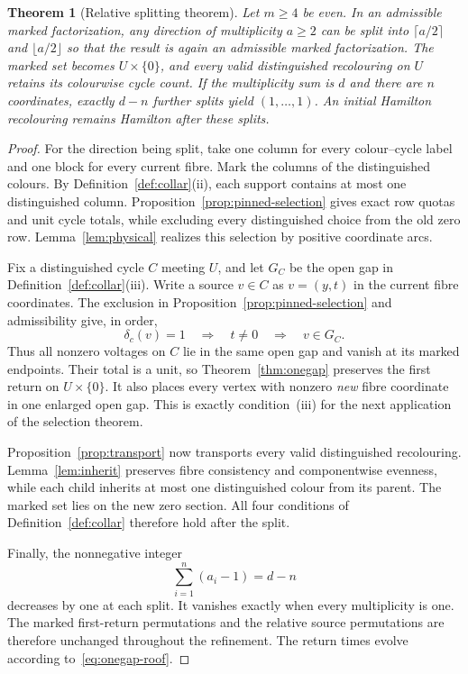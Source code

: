 \documentclass[11pt,reqno]{amsart}
\numberwithin{equation}{section}
\newtheorem{theorem}{Theorem}[section]
\theoremstyle{definition}
\theoremstyle{remark}
\begin{document}
\begin{theorem}[Relative splitting theorem]\label{thm:closure}
Let $m\ge4$ be even. In an admissible marked factorization, any direction of multiplicity
$a\ge2$ can be split into $\lceil a/2\rceil$ and $\lfloor a/2\rfloor$ so that the
result is again an admissible marked factorization. The marked set becomes $U\times\{0\}$,
and every valid distinguished recolouring on $U$ retains its colourwise cycle count.
If the multiplicity sum is $d$ and there are $n$ coordinates, exactly
$d-n$ further splits yield $(1,\ldots,1)$. An initial Hamilton recolouring
remains Hamilton after these splits.
\end{theorem}
\begin{proof}
For the direction being split, take one column for every colour--cycle label
and one block for every current fibre. Mark the columns of the distinguished colours.
By Definition~\ref{def:collar}(ii), each support contains at most one distinguished
column. Proposition~\ref{prop:pinned-selection} gives exact row quotas and unit cycle
totals, while excluding every distinguished choice from the old zero row. Lemma~\ref{lem:physical}
realizes this selection by positive coordinate arcs.

Fix a distinguished cycle $C$ meeting $U$, and let $G_C$ be the open gap
in Definition~\ref{def:collar}(iii). Write a source $v\in C$ as $v=(y,t)$ in
the current fibre coordinates. The exclusion in
Proposition~\ref{prop:pinned-selection} and admissibility give, in order,
\[
 \delta_c(v)=1\quad\Longrightarrow\quad t\ne0
             \quad\Longrightarrow\quad v\in G_C.
\]
Thus all nonzero voltages on $C$ lie in the same open gap and vanish at its
marked endpoints. Their total is a unit, so Theorem~\ref{thm:onegap}
preserves the first return on $U\times\{0\}$. It also places every vertex
with nonzero \emph{new} fibre coordinate in one enlarged open gap. This is
exactly condition~(iii) for the next application of the selection theorem.

Proposition~\ref{prop:transport} now transports every valid distinguished
recolouring. Lemma~\ref{lem:inherit} preserves fibre consistency and
componentwise evenness, while each child inherits at most one distinguished
colour from its parent. The marked set lies on the new zero section.
All four conditions of Definition~\ref{def:collar} therefore hold after the split.

Finally, the nonnegative integer
\[
 \sum_{i=1}^n(a_i-1)=d-n
\]
decreases by one at each split. It vanishes exactly when every multiplicity is
one. The marked first-return permutations and the relative source permutations
are therefore unchanged throughout the refinement. The return times evolve
according to~\eqref{eq:onegap-roof}.
\end{proof}
\end{document}

